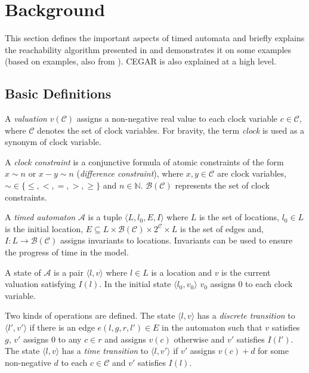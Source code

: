 \chapter{Background}
\label{chap:background}

This section defines the important aspects of timed automata and briefly
explains the reachability algorithm presented in
\cite{bengtsson2004timed} and demonstrates it on some examples (based on examples, also from \cite{bengtsson2004timed}).
CEGAR is also explained at a high level.


\section{Basic Definitions}
A \emph{valuation} $v(\mathcal{C})$ assigns a non-negative real value
to each clock variable $c \in \mathcal{C}$, where $\mathcal{C}$ denotes the set of clock
variables. For bravity, the term \emph{clock} is used as a synonym of {clock variable}.

A \emph{clock constraint} is a conjunctive formula of atomic
constraints of the form $x \sim n$ or $x - y \sim n$ (\emph{difference
	constraint}), where $x,y \in \mathcal{C}$ are clock variables, $\sim \in
\{\leq,<,=,>,\geq\}$ and \hbox{$n \in \mathbb{N}$}. $\mathcal{B}(\mathcal{C})$ represents the set of clock
constraints.

A \emph{timed automaton} $\mathcal{A}$ is a tuple $\langle L, l_0,
E, I\rangle$ where
$L$ is the set of locations,
$l_0 \in L$ is the initial location,
$E \subseteq L \times \mathcal{B}(\mathcal{C}) \times 2^\mathcal{C} \times L$
is the set of edges and,
$I: L \to \mathcal{B}(\mathcal{C})$ assigns invariants to locations.  Invariants can be used to ensure the progress of time in the model.


A state of $\mathcal{A}$ is a pair $\langle l,v \rangle$ where $l \in L$ is a
location and $v$ is the current valuation satisfying $I(l)$. In the initial
state $\langle l_0,v_0 \rangle$ $v_0$ assigns 0 to each clock variable.

Two kinds of operations are defined. The state $\langle l,v \rangle$ has a
\emph{discrete transition} to $\langle l',v' \rangle$  if there is an
edge $e(l,g,r,l') \in E$ in the automaton such that $v$ satisfies $g$, $v'$ assigns 0 to any $c \in
r$ and assigns $v(c)$ otherwise and $v'$ satisfies $I(l')$. The state $\langle
l,v \rangle$ has a \emph{time transition} to $\langle l,v' \rangle$ if $v'$
assigns $v(c)+d$ for some non-negative $d$ to each $c \in \mathcal{C}$ and $v'$
satisfies $I(l)$. 


